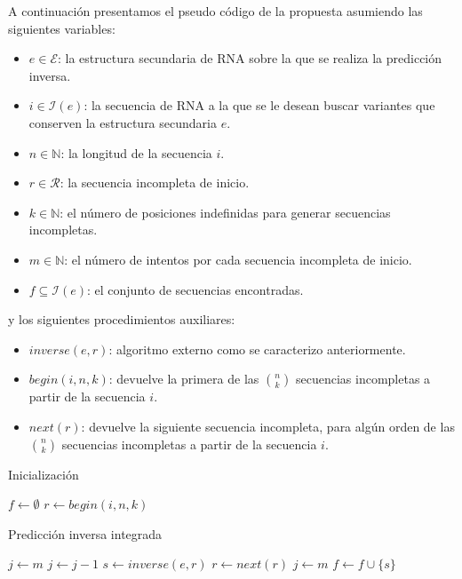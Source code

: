 A continuaci\'on presentamos el pseudo c\'odigo de la propuesta asumiendo las
siguientes variables:
\begin{itemize}
 \item $e \in \mathcal{E}$: la estructura secundaria de \ac{RNA} sobre la que se
realiza la predicci\'on inversa.
 \item $i \in \mathcal{I}(e)$: la secuencia de \ac{RNA} a la que se le desean
buscar variantes que conserven la estructura secundaria $e$.
 \item $n \in \mathbb{N}$: la longitud de la secuencia $i$.
 \item $r \in \mathcal{R}$: la secuencia incompleta de inicio.
 \item $k \in \mathbb{N}$: el n\'umero de posiciones indefinidas para generar
secuencias incompletas.
 \item $m \in \mathbb{N}$: el n\'umero de intentos por cada secuencia incompleta
de inicio.
 \item $f \subseteq \mathcal{I}(e)$: el conjunto de secuencias encontradas.
\end{itemize}

y los siguientes procedimientos auxiliares:
\begin{itemize}
 \item $inverse(e,r)$: algoritmo externo como se caracterizo anteriormente.
 \item $begin(i,n,k)$: devuelve la primera de las $n \choose k$ secuencias
incompletas a partir de la secuencia $i$.
 \item $next(r)$: devuelve la siguiente secuencia incompleta, para alg\'un orden
de las $n \choose k$ secuencias incompletas a partir de la secuencia $i$.
\end{itemize}

\begin{algorithm}
 \caption{Inicializaci\'on}
\begin{algorithmic}[1]
\STATE $f \leftarrow \emptyset$ 
\STATE $r \leftarrow begin(i,n,k)$
\end{algorithmic}
\end{algorithm}

\begin{algorithm}
 \caption{Predicci\'on inversa integrada}
 \begin{algorithmic}[1]
 \STATE $j \leftarrow m$
 \REPEAT
 \STATE $j \leftarrow j-1$
 \STATE $s \leftarrow inverse(e,r)$
 \STATE $r \leftarrow next(r)$
 \STATE $j \leftarrow m$
 \ENDIF
 \STATE $f \leftarrow f \cup \{s\}$
 \end{algorithmic}
\end{algorithm}
